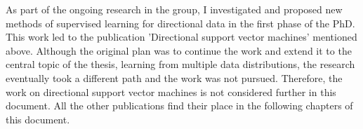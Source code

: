 As part of the ongoing research in the group, I investigated and proposed new methods of supervised learning for directional data in the first phase of the PhD. This work led to the publication 'Directional support vector machines' mentioned above. Although the original plan was to continue the work and extend it to the central topic of the thesis, learning from multiple data distributions, the research eventually took a different path and the work was not pursued. Therefore, the work on directional support vector machines is not considered further in this document. All the other publications find their place in the following chapters of this document.
